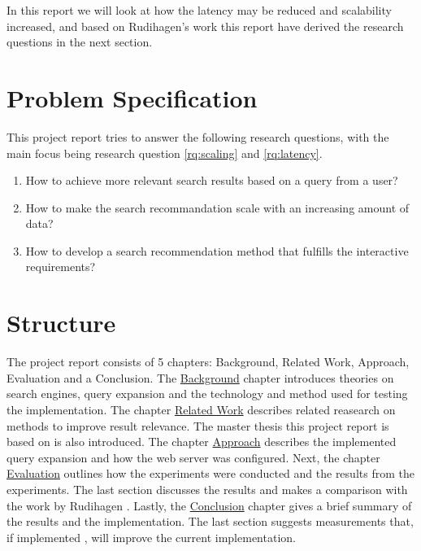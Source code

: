 In this report we will look at how the latency may be reduced and scalability increased,
and based on Rudihagen's work this report have derived the research questions in the next section.

\section{Problem Specification}
\label{sec:problem-specification}
This project report tries to answer the following research questions, with the main focus being research question \ref{rq:scaling} and \ref{rq:latency}.

\begin{enumerate}
  \item How to achieve more relevant search results based on a query from a user?
  \item\label{rq:scaling} How to make the search recommandation scale with an increasing amount of data?
  \item\label{rq:latency} How to develop a search recommendation method that fulfills the interactive requirements?
\end{enumerate}

\section{Structure}
The project report consists of 5 chapters: Background, Related Work, Approach, Evaluation and a Conclusion.
The \hyperref[ch:background]{Background} chapter introduces theories on search engines,
query expansion and the technology and method used for testing the implementation.
The chapter \hyperref[ch:related-work]{Related Work} describes related reasearch on methods to improve result relevance.
The master thesis this project report is based on is also introduced.
The chapter \hyperref[ch:approach]{Approach} describes the implemented query expansion and how the web server was configured.
Next, the chapter \hyperref[ch:evaluation]{Evaluation} outlines how the experiments were conducted and the results from the experiments.
The last section discusses the results and makes a comparison with the work by Rudihagen \cite{master-thesis}.
Lastly, the \hyperref[ch:conclusion]{Conclusion} chapter gives a brief summary of the results and the implementation.
The last section suggests measurements that, if implemented , will improve the current implementation.

